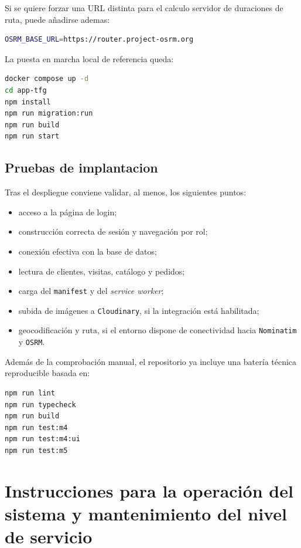 Si se quiere forzar una URL distinta para el calculo servidor de duraciones de ruta, puede añadirse ademas:

\begin{lstlisting}[language=bash]
OSRM_BASE_URL=https://router.project-osrm.org
\end{lstlisting}

La puesta en marcha local de referencia queda:

\begin{lstlisting}[language=bash]
docker compose up -d
cd app-tfg
npm install
npm run migration:run
npm run build
npm run start
\end{lstlisting}

\subsection{Pruebas de implantacion}

Tras el despliegue conviene validar, al menos, los siguientes puntos:

\begin{itemize}
    \item acceso a la página de login;
    \item construcción correcta de sesión y navegación por rol;
    \item conexión efectiva con la base de datos;
    \item lectura de clientes, visitas, catálogo y pedidos;
    \item carga del \texttt{manifest} y del \textit{service worker};
    \item subida de imágenes a \texttt{Cloudinary}, si la integración está habilitada;
    \item geocodificación y ruta, si el entorno dispone de conectividad hacia \texttt{Nominatim} y \texttt{OSRM}.
\end{itemize}

Además de la comprobación manual, el repositorio ya incluye una batería técnica reproducible basada en:

\begin{lstlisting}[language=bash]
npm run lint
npm run typecheck
npm run build
npm run test:m4
npm run test:m4:ui
npm run test:m5
\end{lstlisting}

\section{Instrucciones para la operación del sistema y mantenimiento del nivel de servicio}

